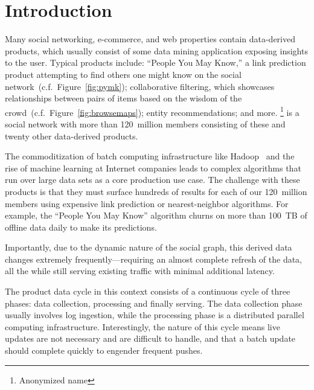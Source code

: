 \section{Introduction}
\label{sec:introduction}

Many social networking, e-commerce, and web properties contain
data-derived products, which usually consist of some data mining
application exposing insights to the user. Typical products include:
``People You May Know,'' a link prediction product attempting to find
others one might know on the social
network~(c.f.~Figure~\ref{fig:pymk}); collaborative filtering, which
showcases relationships between pairs of items based on the wisdom of
the crowd~(c.f.~Figure~\ref{fig:browsemaps}); entity
recommendations; and more. \linkedin\footnote{Anonymized name} is a
social network with more than 120~million members consisting of
these and twenty other data-derived products. 

The commoditization of batch computing infrastructure like Hadoop~\cite{hadoop}
 and the rise of machine learning at Internet companies leads to complex
algorithms that run over large data sets as a core production use
case. The challenge with these products is that they must surface
hundreds of results for each of our 120~million members using
expensive link prediction or nearest-neighbor algorithms. For example,
the ``People You May Know'' algorithm churns on more than 100~TB of offline data
daily to make its predictions.

Importantly, due to the dynamic nature of the social graph, this
derived data changes extremely frequently---requiring an almost
complete refresh of the data, all the while still serving existing
traffic with minimal additional latency. 

The product data cycle in this context consists of a continuous cycle
of three phases: data collection, processing and finally serving. The
data collection phase usually involves log ingestion, while the
processing phase is a distributed parallel computing infrastructure.
Interestingly, the nature of this cycle means live updates are not
necessary and are difficult to handle, and that a batch
update should complete quickly to engender frequent pushes.
 
